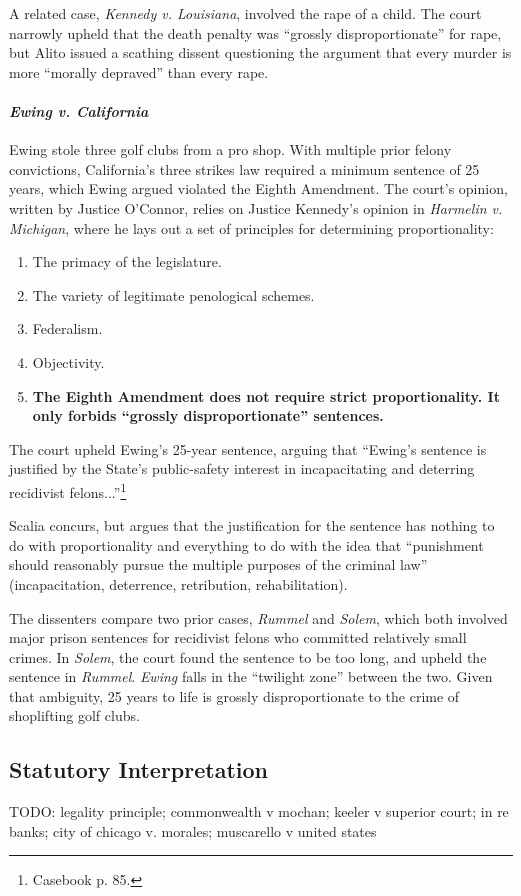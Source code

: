 A related case, \emph{Kennedy v. Louisiana}, involved the rape of a child. The court narrowly upheld that the death penalty was ``grossly disproportionate'' for rape, but Alito issued a scathing dissent questioning the argument that every murder is more ``morally depraved'' than every rape.

\paragraph{\emph{Ewing v. California}} Ewing stole three golf clubs from a pro shop. With multiple prior felony convictions, California's three strikes law required a minimum sentence of 25 years, which Ewing argued violated the Eighth Amendment. The court's opinion, written by Justice O'Connor, relies on Justice Kennedy's opinion in \emph{Harmelin v. Michigan}, where he lays out a set of principles for determining proportionality:

\begin{enumerate}
    \item The primacy of the legislature.
    \item The variety of legitimate penological schemes.
    \item Federalism.
    \item Objectivity.
    \item \textbf{The Eighth Amendment does not require strict proportionality. It only forbids ``grossly disproportionate'' sentences.}
\end{enumerate}

The court upheld Ewing's 25-year sentence, arguing that ``Ewing's sentence is justified by the State's public-safety interest in incapacitating and deterring recidivist felons...''\footnote{Casebook p. 85.}

Scalia concurs, but argues that the justification for the sentence has nothing to do with proportionality and everything to do with the idea that ``punishment should reasonably pursue the multiple purposes of the criminal law'' (incapacitation, deterrence, retribution, rehabilitation).

The dissenters compare two prior cases, \emph{Rummel} and \emph{Solem}, which both involved major prison sentences for recidivist felons who committed relatively small crimes. In \emph{Solem}, the court found the sentence to be too long, and upheld the sentence in \emph{Rummel}. \emph{Ewing} falls in the ``twilight zone'' between the two. Given that ambiguity, 25 years to life is grossly disproportionate to the crime of shoplifting golf clubs.

\subsection{Statutory Interpretation}

TODO: legality principle; commonwealth v mochan; keeler v superior court; in re banks; city of chicago v. morales; muscarello v united states
